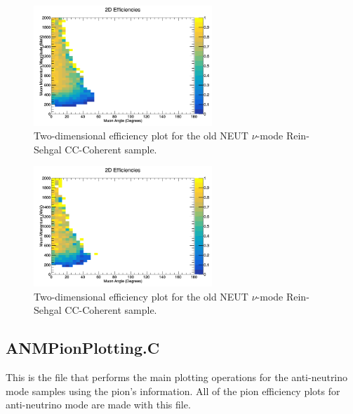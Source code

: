 \documentclass[11pt]{article}
\begin{document}
\begin{figure}[H]
\centering
\includegraphics[width=0.6\textwidth]{CCCohPlots/2DEffANMRS.png}
\caption{Two-dimensional efficiency plot for the old NEUT $\nu$-mode Rein-Sehgal CC-Coherent sample.}
\end{figure}

\begin{figure}[H]
\centering
\includegraphics[width=0.6\textwidth]{CCCohPlots/2DEffANMBS.png}
\caption{Two-dimensional efficiency plot for the old NEUT $\nu$-mode Rein-Sehgal CC-Coherent sample.}
\end{figure}

\subsection{ANMPionPlotting.C}
This is the file that performs the main plotting operations for the anti-neutrino mode samples using the pion's information. All of the pion efficiency plots for anti-neutrino mode are made with this file.
\end{document}
